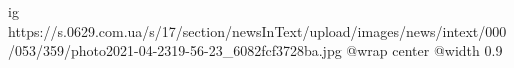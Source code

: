 
 
 
 
 

\ifcmt
  ig https://s.0629.com.ua/s/17/section/newsInText/upload/images/news/intext/000/053/359/photo2021-04-2319-56-23_6082fcf3728ba.jpg
  @wrap center
  @width 0.9
\fi
